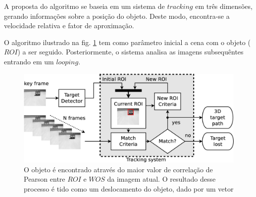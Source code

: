 A proposta do algoritmo se baseia em um sistema de $tracking$ em três dimensões, gerando informações
sobre a posição do objeto. Deste modo, encontra-se a velocidade relativa e fator de aproximação.

O algoritmo ilustrado na fig. \ref{fig:system} tem como parâmetro inicial a cena com o
objeto ($ROI$) a ser seguido. Posteriormente, o sistema analisa as imagens subsequêntes entrando
em um $looping$.

\begin{figure}[h]
\includegraphics[width=\columnwidth]{images/figure1-diagram1.eps}
\caption{O objeto é encontrado através do maior valor de correlação de Pearson entre $ROI$ e $WOS$ da imagem atual. 
O resultado desse processo é tido como um deslocamento do objeto, dado por um vetor}
\label{fig:system}
\end{figure}


